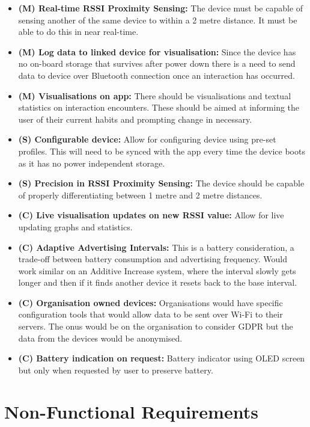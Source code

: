 \documentclass{l4proj}
\begin{document}
\begin{itemize}
    \item \textbf{(M) Real-time RSSI Proximity Sensing: } The device must be capable of sensing another of the same device to within a 2 metre distance. It must be able to do this in near real-time.
    \item \textbf{(M) Log data to linked device for visualisation: } Since the device has no on-board storage that survives after power down there is a need to send data to device over Bluetooth connection once an interaction has occurred.
    \item \textbf{(M) Visualisations on app: } There should be visualisations and textual statistics on interaction encounters. These should be aimed at informing the user of their current habits and prompting change in necessary.
    \item \textbf{(S) Configurable device: } Allow for configuring device using pre-set profiles. This will need to be synced with the app every time the device boots as it has no power independent storage.
    \item \textbf{(S) Precision in RSSI Proximity Sensing: } The device should be capable of properly differentiating between 1 metre and 2 metre distances.
    \item \textbf{(C) Live visualisation updates on new RSSI value: } Allow for live updating graphs and statistics.
    \item \textbf{(C) Adaptive Advertising Intervals: } This is a battery consideration, a trade-off between battery consumption and advertising frequency. Would work similar on an Additive Increase system, where the interval slowly gets longer and then if it finds another device it resets back to the base interval.
    \item \textbf{(C) Organisation owned devices: } Organisations would have specific configuration tools that would allow data to be sent over Wi-Fi to their servers. The onus would be on the organisation to consider GDPR but the data from the devices would be anonymised.
    \item \textbf{(C) Battery indication on request: } Battery indicator using OLED screen but only when requested by user to preserve battery.
\end{itemize}

\section{Non-Functional Requirements}
\end{document}
